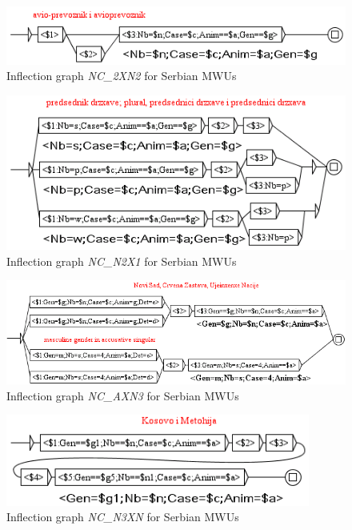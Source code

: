 \begin{figure}[!htb]
  \centering
  \includegraphics[width=12.4cm]{resources/img/NC'2XN2'SRB.png}
  \caption{Inflection graph \emph{NC\_2XN2} for Serbian MWUs}
  \label{fig:NC'2XN2'SRB}
\end{figure}

\begin{figure}[!htb]
  \centering
  \includegraphics[width=12.2cm]{resources/img/NC'N2X1'SRB.png}
  \caption{Inflection graph \emph{NC\_N2X1} for Serbian MWUs}
  \label{fig:NC'N2X1'SRB}
\end{figure}

\begin{figure}[!htb]
  \centering
  \includegraphics[width=15cm]{resources/img/NC'AXN3'SRB.png}
  \caption{Inflection graph \emph{NC\_AXN3} for Serbian MWUs}
  \label{fig:NC'AXN3'SRB}
\end{figure}

\begin{figure}[!htb]
  \centering
  \includegraphics[width=10cm]{resources/img/NC'N3XN'SRB.png}
  \caption{Inflection graph \emph{NC\_N3XN} for Serbian MWUs}
  \label{fig:NC'N3XN'SRB}
\end{figure}

